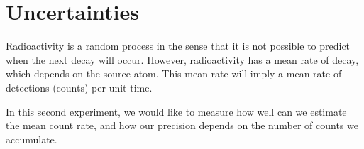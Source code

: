 \section{Uncertainties}

Radioactivity is a random process in the sense that it is not possible to predict when the next decay will occur. However, radioactivity has a mean rate of decay, which depends on the source atom. This mean rate will imply a mean rate of detections (counts) per unit time.

In this second experiment, we would like to measure how well can we estimate the mean count rate, and how our precision depends on the number of counts we accumulate.
